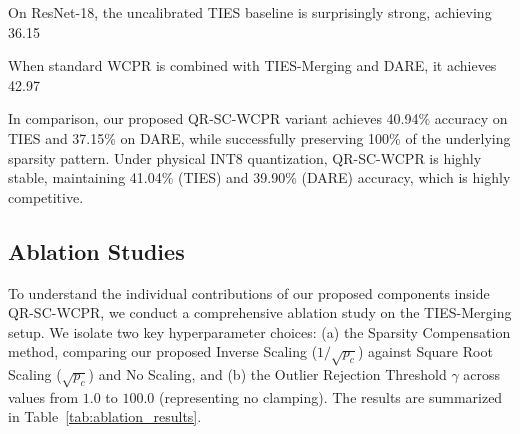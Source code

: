 \documentclass{article}
\theoremstyle{plain}
\theoremstyle{definition}
\theoremstyle{remark}
\begin{document}
On ResNet-18, the uncalibrated TIES baseline is surprisingly strong, achieving 36.15%

When standard WCPR is combined with TIES-Merging and DARE, it achieves 42.97%

In comparison, our proposed QR-SC-WCPR variant achieves 40.94\% accuracy on TIES and 37.15\% on DARE, while successfully preserving 100\% of the underlying sparsity pattern. Under physical INT8 quantization, QR-SC-WCPR is highly stable, maintaining 41.04\% (TIES) and 39.90\% (DARE) accuracy, which is highly competitive.

\subsection{Ablation Studies}
\label{subsec:ablation}

To understand the individual contributions of our proposed components inside QR-SC-WCPR, we conduct a comprehensive ablation study on the TIES-Merging setup. We isolate two key hyperparameter choices: (a) the Sparsity Compensation method, comparing our proposed Inverse Scaling ($1/\sqrt{p_c}$) against Square Root Scaling ($\sqrt{p_c}$) and No Scaling, and (b) the Outlier Rejection Threshold $\gamma$ across values from $1.0$ to $100.0$ (representing no clamping). The results are summarized in Table~\ref{tab:ablation_results}.
\end{document}

